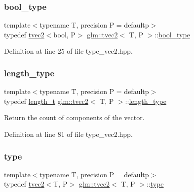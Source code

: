 \subsubsection{\texorpdfstring{bool\_type}{bool\_type}}
{\footnotesize\ttfamily template$<$typename T, precision P = defaultp$>$ \\
typedef \mbox{\hyperlink{structglm_1_1tvec2}{tvec2}}$<$bool, P$>$ \mbox{\hyperlink{structglm_1_1tvec2}{glm\+::tvec2}}$<$ T, P $>$\+::\mbox{\hyperlink{structglm_1_1tvec2_add34b9138a842221f63186e25378d92e}{bool\+\_\+type}}}



Definition at line 25 of file type\+\_\+vec2.\+hpp.

\mbox{\label{structglm_1_1tvec2_a5a5ddebab821a3cf9185772386afbe8d}} 
\subsubsection{\texorpdfstring{length\_type}{length\_type}}
{\footnotesize\ttfamily template$<$typename T, precision P = defaultp$>$ \\
typedef \mbox{\hyperlink{namespaceglm_a090a0de2260835bee80e71a702492ed9}{length\+\_\+t}} \mbox{\hyperlink{structglm_1_1tvec2}{glm\+::tvec2}}$<$ T, P $>$\+::\mbox{\hyperlink{structglm_1_1tvec2_a5a5ddebab821a3cf9185772386afbe8d}{length\+\_\+type}}}



Return the count of components of the vector. 



Definition at line 81 of file type\+\_\+vec2.\+hpp.

\mbox{\label{structglm_1_1tvec2_a387f2c68c61e26e75bbe3d67ee878f41}} 
\subsubsection{\texorpdfstring{type}{type}}
{\footnotesize\ttfamily template$<$typename T, precision P = defaultp$>$ \\
typedef \mbox{\hyperlink{structglm_1_1tvec2}{tvec2}}$<$T, P$>$ \mbox{\hyperlink{structglm_1_1tvec2}{glm\+::tvec2}}$<$ T, P $>$\+::\mbox{\hyperlink{structglm_1_1tvec2_a387f2c68c61e26e75bbe3d67ee878f41}{type}}}



